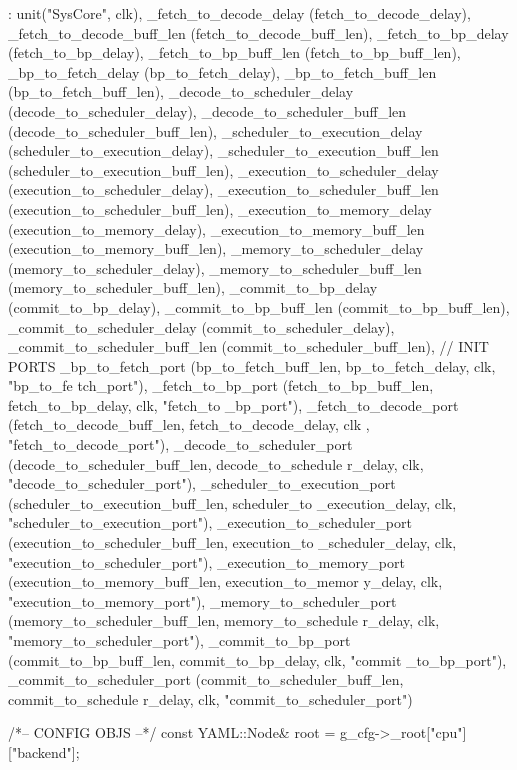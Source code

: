\label{classsysCore_a901e2a907eaf392df936326bda6173f7}

\begin{DoxyCode}
        : unit("SysCore", clk),
      _fetch_to_decode_delay (fetch_to_decode_delay),
          _fetch_to_decode_buff_len (fetch_to_decode_buff_len),
          _fetch_to_bp_delay (fetch_to_bp_delay),
          _fetch_to_bp_buff_len (fetch_to_bp_buff_len),
          _bp_to_fetch_delay (bp_to_fetch_delay),
          _bp_to_fetch_buff_len (bp_to_fetch_buff_len),
          _decode_to_scheduler_delay (decode_to_scheduler_delay),
          _decode_to_scheduler_buff_len (decode_to_scheduler_buff_len),
          _scheduler_to_execution_delay (scheduler_to_execution_delay),
          _scheduler_to_execution_buff_len (scheduler_to_execution_buff_len),
          _execution_to_scheduler_delay (execution_to_scheduler_delay),
          _execution_to_scheduler_buff_len (execution_to_scheduler_buff_len),
          _execution_to_memory_delay (execution_to_memory_delay),
          _execution_to_memory_buff_len (execution_to_memory_buff_len),
          _memory_to_scheduler_delay (memory_to_scheduler_delay),
          _memory_to_scheduler_buff_len (memory_to_scheduler_buff_len),
          _commit_to_bp_delay (commit_to_bp_delay),
          _commit_to_bp_buff_len (commit_to_bp_buff_len),
          _commit_to_scheduler_delay (commit_to_scheduler_delay),
          _commit_to_scheduler_buff_len (commit_to_scheduler_buff_len),
      // INIT PORTS
      _bp_to_fetch_port (bp_to_fetch_buff_len, bp_to_fetch_delay, clk,  "bp_to_fe
      tch_port"),
      _fetch_to_bp_port (fetch_to_bp_buff_len, fetch_to_bp_delay,  clk, "fetch_to
      _bp_port"),
      _fetch_to_decode_port (fetch_to_decode_buff_len, fetch_to_decode_delay, clk
      , "fetch_to_decode_port"),
      _decode_to_scheduler_port (decode_to_scheduler_buff_len, decode_to_schedule
      r_delay, clk, "decode_to_scheduler_port"),
      _scheduler_to_execution_port (scheduler_to_execution_buff_len, scheduler_to
      _execution_delay, clk, "scheduler_to_execution_port"),
      _execution_to_scheduler_port (execution_to_scheduler_buff_len, execution_to
      _scheduler_delay, clk, "execution_to_scheduler_port"),
      _execution_to_memory_port (execution_to_memory_buff_len, execution_to_memor
      y_delay, clk, "execution_to_memory_port"),
      _memory_to_scheduler_port (memory_to_scheduler_buff_len, memory_to_schedule
      r_delay, clk, "memory_to_scheduler_port"),
      _commit_to_bp_port (commit_to_bp_buff_len, commit_to_bp_delay, clk, "commit
      _to_bp_port"),
      _commit_to_scheduler_port (commit_to_scheduler_buff_len, commit_to_schedule
      r_delay, clk, "commit_to_scheduler_port")
{
    /*-- CONFIG OBJS --*/
    const YAML::Node& root = g_cfg->_root["cpu"]["backend"];

}
\end{DoxyCode}
